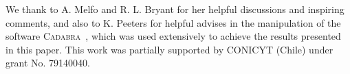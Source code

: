 \documentclass[aps,prl,twocolumn,superscriptaddress,showpacs,showkeys]{revtex4-1}
\begin{document}


\begin{acknowledgments}
  We thank to A. Melfo and R. L. Bryant for her helpful discussions and inspiring comments, and also to K. Peeters for helpful advises in the manipulation of the software \textsc{Cadabra}~\cite{Peeters:2007wn,*peeters2007symbolic,*Peeters2007550}, which was used extensively to achieve the results presented in this paper.
  This work was partially supported by CONICYT (Chile) under grant No. 79140040.
\end{acknowledgments}




\end{document}

